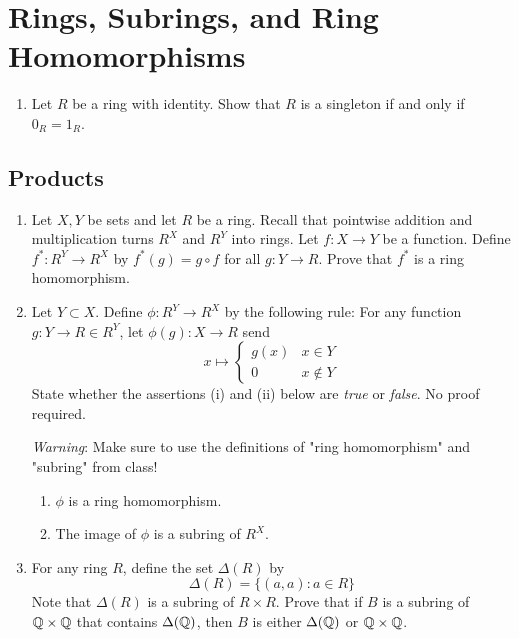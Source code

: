 \documentclass[../psets.tex]{subfiles}
\begin{document}
\section{Rings, Subrings, and Ring Homomorphisms}
\begin{enumerate}
    \item {}Let $R$ be a ring with identity. Show that $R$ is a singleton if and only if $0_R=1_R$.
\end{enumerate}


\subsection*{Products}
\begin{enumerate}[resume]
    \item Let $X,Y$ be sets and let $R$ be a ring. Recall that pointwise addition and multiplication turns $R^X$ and $R^Y$ into rings. Let $f:X\to Y$ be a function. Define $f^*:R^Y\to R^X$ by $f^*(g)=g\circ f$ for all $g:Y\to R$. Prove that $f^*$ is a ring homomorphism.
    \item Let $Y\subset X$. Define $\phi:R^Y\to R^X$ by the following rule: For any function $g:Y\to R\in R^Y$, let $\phi(g):X\to R$ send
    \begin{equation*}
        x \mapsto
        \begin{cases}
            g(x) & x\in Y\\
            0 & x\notin Y
        \end{cases}
    \end{equation*}
    State whether the assertions (i) and (ii) below are \emph{true} or \emph{false}. No proof required.\par
    \emph{Warning}: Make sure to use the definitions of "ring homomorphism" and "subring" from class!
    \begin{enumerate}
        \item $\phi$ is a ring homomorphism.
        \item The image of $\phi$ is a subring of $R^X$.
    \end{enumerate}
    \item For any ring $R$, define the set $\Delta(R)$ by
    \begin{equation*}
        \Delta(R) = \{(a,a):a\in R\}
    \end{equation*}
    Note that $\Delta(R)$ is a subring of $R\times R$. Prove that if $B$ is a subring of $\mathbb{Q}\times\mathbb{Q}$ that contains $\Delta(\mathbb{Q})$, then $B$ is either $\Delta(\mathbb{Q})$ or $\mathbb{Q}\times\mathbb{Q}$.
\end{enumerate}
\end{document}
